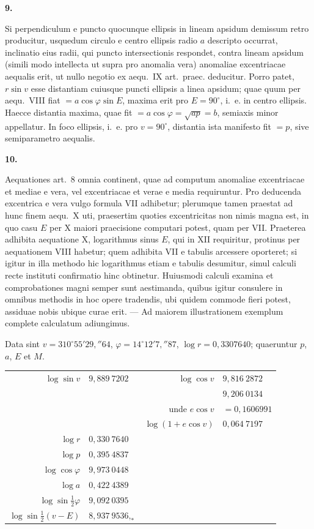 \documentclass[12pt,a4paper]{book}
\begin{document}
\textbf{9.}

Si perpendiculum e puncto quocunque ellipsis in lineam apsidum demissum retro producitur, usquedum circulo e centro ellipsis radio $a$ descripto occurrat, inclinatio eius radii, qui puncto intersectionis respondet, contra lineam apsidum (simili modo intellecta ut supra pro anomalia vera) anomaliae excentriacae aequalis erit, ut nullo negotio ex aequ.~IX art.~praec. deducitur. Porro patet, $r\sin v$ esse distantiam cuiusque puncti ellipsis a linea apsidum; quae quum per aequ.~VIII fiat $=a\cos\varphi\sin E$, maxima erit pro $E=90^{\circ}$, i.~e. in centro ellipsis. Haecce distantia maxima, quae fit $=a\cos\varphi=\sqrt{ap}=b$, semiaxis minor appellatur. In foco ellipsis, i.~e. pro $v=90^{\circ}$, distantia ista manifesto fit $=p$, sive semiparametro aequalis.

\textbf{10.}

Aequationes art.~8 omnia continent, quae ad computum anomaliae excentriacae et mediae e vera, vel excentriacae et verae e media requiruntur. Pro deducenda excentrica e vera vulgo formula VII adhibetur; plerumque tamen praestat ad hunc finem aequ.~X uti, praesertim quoties excentricitas non nimis magna est, in quo casu $E$ per X maiori praecisione computari potest, quam per VII. Praeterea adhibita aequatione X, logarithmus sinus $E$, qui in XII requiritur, protinus per aequationem VIII habetur; quem adhibita VII e tabulis arcessere oporteret; si igitur in illa methodo hic logarithmus etiam e tabulis desumitur, simul calculi recte instituti confirmatio hinc obtinetur. Huiusmodi calculi examina et comprobationes magni semper sunt aestimanda, quibus igitur consulere in omnibus methodis in hoc opere tradendis, ubi quidem commode fieri potest, assiduae nobis ubique curae erit. --- Ad maiorem illustrationem exemplum complete calculatum adiungimus.

Data sint $v=310^{\circ}55'29{,}''64$, $\varphi=14^{\circ}12'7{,}''87$, $\log r=0{,}3307640$; quaeruntur $p$, $a$, $E$ et $M$.

\begin{center}
\begin{tabular}{@{}r@{\quad}l@{\quad}|@{\quad}r@{\quad}l@{}}
$\log\sin v$ & $9{,}889\ 7202$ & $\log\cos v$ & $9{,}816\ 2872$ \\
& & & $9{,}206\ 0134$ \\
& & unde $e\cos v$ & $=0{,}1606991$ \\
& & $\log(1+e\cos v)$ & $0{,}064\ 7197$ \\
$\log r$ & $0{,}330\ 7640$ & & \\
$\log p$ & $0{,}395\ 4837$ & & \\[0.5ex]
$\log\cos\varphi$ & $9{,}973\ 0448$ & & \\
$\log a$ & $0{,}422\ 4389$ & & \\[0.5ex]
$\log\sin\tfrac{1}{2}\varphi$ & $9{,}092\ 0395$ & & \\
$\log\sin\tfrac{1}{2}(v-E)$ & $8{,}937\ 9536{,}_{*}$ & &
\end{tabular}
\end{center}
\end{document}
